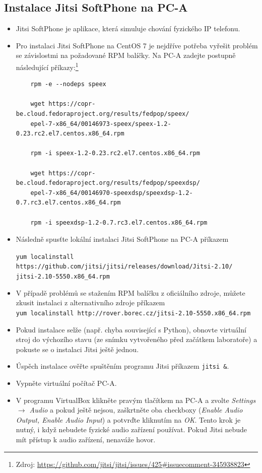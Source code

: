 \subsection{Instalace Jitsi SoftPhone na PC-A}
\begin{itemize}
  \item Jitsi SoftPhone je aplikace, která simuluje chování fyzického IP telefonu.
  
  \item Pro instalaci Jitsi SoftPhone na CentOS 7 je nejdříve potřeba vyřešit problém se závislostmi na požadované RPM balíčky. Na PC-A zadejte postupně následující příkazy:\footnote{Zdroj: \url{https://github.com/jitsi/jitsi/issues/425#issuecomment-345938823}}
      
	\begin{verbatim}
	rpm -e --nodeps speex
	
	wget https://copr-be.cloud.fedoraproject.org/results/fedpop/speex/
	epel-7-x86_64/00146973-speex/speex-1.2-0.23.rc2.el7.centos.x86_64.rpm
	
	rpm -i speex-1.2-0.23.rc2.el7.centos.x86_64.rpm
	
	wget https://copr-be.cloud.fedoraproject.org/results/fedpop/speexdsp/
	epel-7-x86_64/00146970-speexdsp/speexdsp-1.2-0.7.rc3.el7.centos.x86_64.rpm
	
	rpm -i speexdsp-1.2-0.7.rc3.el7.centos.x86_64.rpm
	\end{verbatim}
	
  \item Následně spusťte lokální instalaci Jitsi SoftPhone na PC-A příkazem
  
  \verb{yum localinstall https://github.com/jitsi/jitsi/releases/download/Jitsi-2.10/{\\
  \verb{jitsi-2.10-5550.x86_64.rpm{
  
  \item V případě problémů se stažením RPM balíčku z oficiálního zdroje, můžete zkusit instalaci z alternativního zdroje příkazem\\
  \verb{yum localinstall http://rover.borec.cz/jitsi-2.10-5550.x86_64.rpm{
  
  \item Pokud instalace selže (např. chyba související s Python), obnovte virtuální stroj do výchozího stavu (ze snímku vytvořeného před začátkem laboratoře) a pokuste se o instalaci Jitsi ještě jednou.
  
  \item Úspěch instalace ověřte spuštěním programu Jitsi příkazem \texttt{jitsi \&}.
  
  \item Vypněte virtuální počítač PC-A.
  
  \item V programu VirtualBox klikněte pravým tlačítkem na PC-A a zvolte \emph{Settings $\rightarrow$ Audio} a pokud ještě nejsou, zaškrtněte oba checkboxy (\emph{Enable Audio Output, Enable Audio Input}) a potvrďte kliknutím na \emph{OK}. Tento krok je nutný, i když nebudete fyzické audio zařízení používat. Pokud Jitsi nebude mít přístup k audio zařízení, nenaváže hovor.
\end{itemize}
  

